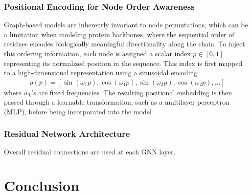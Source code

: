 \documentclass[12pt]{report}
\begin{document}
\subsection{Positional Encoding for Node Order Awareness}
Graph-based models are inherently invariant to node permutations, which can be a limitation when modeling protein backbones, where the sequential order of residues encodes biologically meaningful directionality along the chain. To inject this ordering information, each node is assigned a scalar index \(p\in\left[0,1\right]\) representing its normalized position in the sequence. This index is first mapped to a high-dimensional representation using a sinusoidal encoding \cite{vaswaniAttentionAllYou2017}
\begin{align*}
    \rho\left(p\right)=\left[\sin\left(\omega_1 p\right),\cos\left(\omega_1 p\right),\sin\left(\omega_2 p\right),\cos\left(\omega_2 p\right),...\right]
\end{align*}
where \(w_k\)'s are fixed frequencies. The resulting positional embedding is then passed through a learnable transformation, such as a multilayer perceptron (MLP), before being incorporated into the model
\subsection{Residual Network Architecture}
Overall residual connections are used at each GNN layer.

\chapter{Conclusion}\label{chapter:Conclusion}




\end{document}
